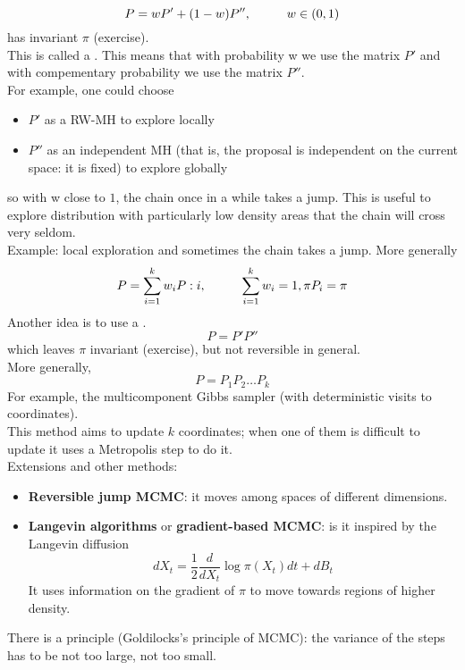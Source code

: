 \documentclass{article}
\begin{document}
	\begin{equation*}
		P = w P' + (1-w) P'', \hspace{1 cm} w \in (0,1)
	\end{equation*}
	has invariant $\pi$ (exercise). \\
	This is called a . This means that with probability w we use the matrix $P'$ and with compementary probability we use the matrix $P''$. \\
	For example, one could choose
	\begin{itemize}
		\item $P'$ as a RW-MH to explore locally
		\item $P''$ as an independent MH (that is, the proposal is independent on the current space: it is fixed) to explore globally 
	\end{itemize}
	so with w close to $1$, the chain once in a while takes a jump. This is useful to explore distribution with particularly low density areas that the chain will cross very seldom.\\
	Example: local exploration and sometimes the chain takes a jump. 
	More generally
	\begin{equation*}
		P = \sum_{i = 1}^k w_i P:i, \hspace{1 cm} \sum_{i=1}^k w_i=1, \pi P_i = \pi
	\end{equation*}
	Another idea is to use a . 
	\begin{equation*}
		P=P' P''    
	\end{equation*}
	which leaves $\pi$ invariant (exercise), but not reversible in general.\\
	More generally, 
	\begin{equation*}
		P=P_1P_2 \ldots P_k
	\end{equation*}
	For example, the multicomponent Gibbs sampler (with deterministic visits to coordinates).\\
	
	This method aims to update $k$ coordinates; when one of them is difficult to update it uses a Metropolis step to do it. \\
	
	Extensions and other methods:
	\begin{itemize}
		\item \textbf{Reversible jump MCMC}: it moves among spaces of different dimensions.  
		\item \textbf{Langevin algorithms} or \textbf{gradient-based MCMC}: is it inspired by the Langevin diffusion
		\begin{equation*}
			dX_t = \frac{1}{2} \frac{d}{dX_t} \log\pi(X_t)dt + dB_t
		\end{equation*}
		It uses information on the gradient of $\pi$ to move towards regions of higher density.
	\end{itemize}
	There is a principle (Goldilocks's principle of MCMC): the variance of the steps has to be not too large, not too small.
\end{document}
